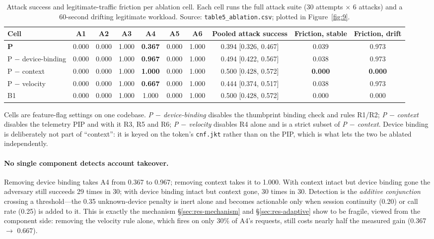 \setcounter{table}{6}
\begin{table}[t]
\centering
\caption{Attack success and legitimate-traffic friction per ablation cell. Each cell runs the full attack suite (30 attempts $\times$ 6 attacks) and a 60-second drifting legitimate workload. Source: \texttt{table5\_ablation.csv}; plotted in Figure~\ref{fig:9}.}
\label{tab:7}
\footnotesize
\begin{tabular}{lccccccccc}
\toprule
Cell & A1 & A2 & A3 & A4 & A5 & A6 & Pooled attack success & Friction, stable & Friction, drift \\
\midrule
\textbf{P} & 0.000 & 0.000 & 1.000 & \textbf{0.367} & 0.000 & 1.000 & 0.394 [0.326, 0.467] & 0.039 & 0.973 \\
P $-$ device-binding & 0.000 & 0.000 & 1.000 & \textbf{0.967} & 0.000 & 1.000 & 0.494 [0.422, 0.567] & 0.038 & 0.973 \\
P $-$ context & 0.000 & 0.000 & 1.000 & \textbf{1.000} & 0.000 & 1.000 & 0.500 [0.428, 0.572] & \textbf{0.000} & \textbf{0.000} \\
P $-$ velocity & 0.000 & 0.000 & 1.000 & \textbf{0.667} & 0.000 & 1.000 & 0.444 [0.374, 0.517] & 0.038 & 0.973 \\
B1 & 0.000 & 0.000 & 1.000 & 1.000 & 0.000 & 1.000 & 0.500 [0.428, 0.572] & 0.000 & 0.000 \\
\bottomrule
\end{tabular}
\end{table}

Cells are feature-flag settings on one codebase. \textit{P $-$ device-binding} disables the thumbprint binding check and rules R1/R2; \textit{P $-$ context} disables the telemetry PIP and with it R3, R5 and R6; \textit{P $-$ velocity} disables R4 alone and is a strict subset of \textit{P $-$ context}. Device binding is deliberately not part of ``context'': it is keyed on the token's \texttt{cnf.jkt} rather than on the PIP, which is what lets the two be ablated independently.

\paragraph{No single component detects account takeover.} Removing device binding takes A4 from 0.367 to 0.967; removing context takes it to 1.000. With context intact but device binding gone the adversary still succeeds 29 times in 30; with device binding intact but context gone, 30 times in 30. Detection is the \textit{additive conjunction} crossing a threshold---the 0.35 unknown-device penalty is inert alone and becomes actionable only when session continuity (0.20) or call rate (0.25) is added to it. This is exactly the mechanism \S\ref{sec:res-mechanism} and \S\ref{sec:res-adaptive} show to be fragile, viewed from the component side: removing the velocity rule alone, which fires on only 30\% of A4's requests, still costs nearly half the measured gain (0.367 $\rightarrow$ 0.667).

